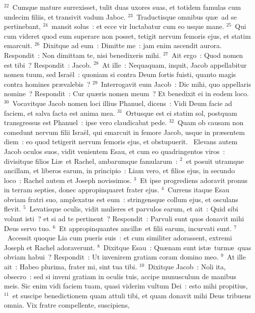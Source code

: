 ${}^{22}$~Cumque mature surrexisset, tulit duas uxores suas, et totidem famulas cum undecim filiis, et transivit vadum Jaboc.
${}^{23}$~Traductisque omnibus qu\ae\ ad se pertinebant,
${}^{24}$~mansit solus~: et ecce vir luctabatur cum eo usque mane.
${}^{25}$~Qui cum videret quod eum superare non posset, tetigit nervum femoris ejus, et statim emarcuit.
${}^{26}$~Dixitque ad eum~: Dimitte me~: jam enim ascendit aurora. Respondit~: Non dimittam te, nisi benedixeris mihi.
${}^{27}$~Ait ergo~: Quod nomen est tibi~? Respondit~: Jacob.
${}^{28}$~At ille~: Nequaquam, inquit, Jacob appellabitur nomen tuum, sed Isra\"el~: quoniam si contra Deum fortis fuisti, quanto magis contra homines pr\ae valebis~?
${}^{29}$~Interrogavit eum Jacob~: Dic mihi, quo appellaris nomine~? Respondit~: Cur qu\ae ris nomen meum~? Et benedixit ei in eodem loco.
${}^{30}$~Vocavitque Jacob nomen loci illius Phanuel, dicens~: Vidi Deum facie ad faciem, et salva facta est anima mea.
${}^{31}$~Ortusque est ei statim sol, postquam transgressus est Phanuel~: ipse vero claudicabat pede.
${}^{32}$~Quam ob causam non comedunt nervum filii Isra\"el, qui emarcuit in femore Jacob, usque in pr\ae sentem diem~: eo quod tetigerit nervum femoris ejus, et obstupuerit.
~Elevans autem Jacob oculos suos, vidit venientem Esau, et cum eo quadringentos viros~: divisitque filios Li\ae\ et Rachel, ambarumque famularum~:
${}^{2}$~et posuit utramque ancillam, et liberos earum, in principio~: Liam vero, et filios ejus, in secundo loco~: Rachel autem et Joseph novissimos.
${}^{3}$~Et ipse progrediens adoravit pronus in terram septies, donec appropinquaret frater ejus.
${}^{4}$~Currens itaque Esau obviam fratri suo, amplexatus est eum~: stringensque collum ejus, et osculans flevit.
${}^{5}$~Levatisque oculis, vidit mulieres et parvulos earum, et ait~: Quid sibi volunt isti~? et si ad te pertinent~? Respondit~: Parvuli sunt quos donavit mihi Deus servo tuo.
${}^{6}$~Et appropinquantes ancill\ae\ et filii earum, incurvati sunt.
${}^{7}$~Accessit quoque Lia cum pueris suis~: et cum similiter adorassent, extremi Joseph et Rachel adoraverunt.
${}^{8}$~Dixitque Esau~: Qu\ae nam sunt ist\ae\ turm\ae\ quas obviam habui~? Respondit~: Ut invenirem gratiam coram domino meo.
${}^{9}$~At ille ait~: Habeo plurima, frater mi, sint tua tibi.
${}^{10}$~Dixitque Jacob~: Noli ita, obsecro~: sed si inveni gratiam in oculis tuis, accipe munusculum de manibus meis. Sic enim vidi faciem tuam, quasi viderim vultum Dei~: esto mihi propitius,
${}^{11}$~et suscipe benedictionem quam attuli tibi, et quam donavit mihi Deus tribuens omnia. Vix fratre compellente, suscipiens,
